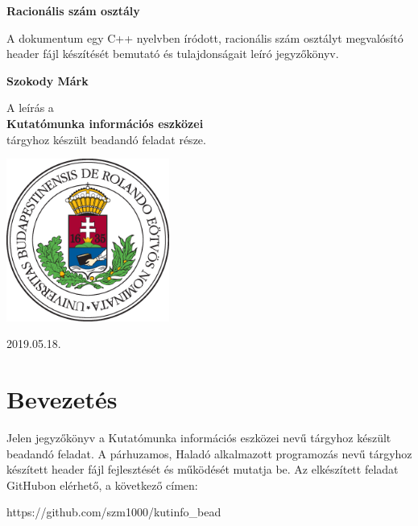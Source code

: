 \documentclass[a4paper, 12pt]{article}
\begin{document}
\begin{titlepage}
    \begin{center}
        \vspace*{1cm}
 
        \Huge
        \textbf{Racionális szám osztály\\}
 
        \vspace{0.5cm}
        \Large
	A dokumentum egy C++ nyelvben íródott, racionális szám osztályt megvalósító header fájl készítését bemutató és  tulajdonságait leíró jegyzőkönyv.
 
        \vspace{1.5cm}
 
        \textbf{ Szokody Márk\\}
 
        \vfill

        \large  

        A leírás a\\
       \textbf{ Kutatómunka információs eszközei}\\
        tárgyhoz készült beadandó feladat része.
 
        \vspace{0.8cm}
 
        \includegraphics[width=0.4\textwidth]{elte.eps}
 
        \Large
        2019.05.18.
 
    \end{center}
\end{titlepage}

\section{Bevezetés}
Jelen jegyzőkönyv a Kutatómunka információs eszközei nevű tárgyhoz készült beadandó feladat. A párhuzamos, Haladó alkalmazott programozás nevű tárgyhoz készített header fájl fejlesztését és működését mutatja be.
Az elkészített feladat GitHubon elérhető, a következő címen:
\begin{center}
https://github.com/szm1000/kutinfo\_bead
\end{center}
\end{document}
